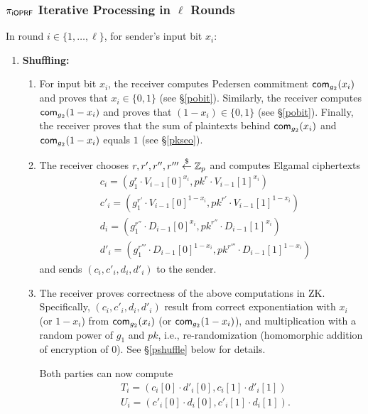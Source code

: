 \subsubsection{${\pi_{\mathsf{i}\mathsf{OPRF}}}$ Iterative Processing in $\ell$ Rounds}
In round $i\in\{1,\ldots,\ell\}$, for sender's input bit $x_i$:
\begin{enumerate}
\item {\bf Shuffling:}
\begin{enumerate}
\item For input bit $x_i$, the receiver computes Pedersen commitment
  $\mathsf{com}_{g_2}(x_i)$ and proves that $x_i\in\{0,1\}$ (see
  \S\ref{pobit}). Similarly, the receiver computes $\mathsf{com}_{g_2}(1-x_i)$
  and proves that $(1-x_i)\in\{0,1\}$ (see \S\ref{pobit}). Finally,
  the receiver proves that the sum of plaintexts behind
  $\mathsf{com}_{g_2}(x_i)$ and $\mathsf{com}_{g_2}(1-x_i)$ equals $1$ (see
  \S\ref{pkseo}).


\item  The receiver chooses $r,r',r'',r'''\stackrel{\$}{\leftarrow}\mathbb{Z}_p$ and computes Elgamal ciphertexts
  \begin{align*}
    &c_i=(g_1^r\cdot{}V_{i-1}[0]^{x_i},pk^{r}\cdot{}V_{i-1}[1]^{x_i})
    \\&c'_i=(g_1^{r'}\cdot{}V_{i-1}[0]^{1-x_i},pk^{r'}\cdot{}V_{i-1}[1]^{1-x_i})
    \\&d_i=(g_1^{r''}\cdot{}D_{i-1}[0]^{x_i},pk^{r''}\cdot{}D_{i-1}[1]^{x_i})
    \\&d'_i=(g_1^{r'''}\cdot{}D_{i-1}[0]^{1-x_i},pk^{r'''}\cdot{}D_{i-1}[1]^{1-x_i})%
  \end{align*}
  and sends $(c_i,c'_i,d_i,d'_i)$ to the sender.

\item The receiver proves correctness of the above computations in
  ZK. Specifically, $(c_i,c'_i,d_i,d'_i)$ result from correct
  exponentiation with $x_i$ (or $1-x_i$) from $\mathsf{com}_{g_2}(x_i)$ (or
  $\mathsf{com}_{g_2}(1-x_i)$), and multiplication with a random power of
  $g_1$ and $pk$, i.e., re-randomization (homomorphic addition of
  encryption of $0$).  See \S\ref{pshuffle} below for details.

   Both parties can now compute
    \begin{align*}&T_i=(c_i[0]\cdot{}d'_i[0],c_i[1]\cdot{}d'_i[1])
    \\&U_i=(c'_i[0]\cdot{}d_i[0],c'_i[1]\cdot{}d_i[1]).
    \end{align*}
   
  \end{enumerate}


\end{enumerate}
